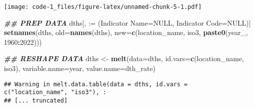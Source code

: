\documentclass[
]{article}
\newenvironment{Shaded}{\begin{snugshade}}{\end{snugshade}}
\newcommand{\AttributeTok}[1]{\textcolor[rgb]{0.13,0.29,0.53}{#1}}
\newcommand{\ConstantTok}[1]{\textcolor[rgb]{0.56,0.35,0.01}{#1}}
\newcommand{\DecValTok}[1]{\textcolor[rgb]{0.00,0.00,0.81}{#1}}
\newcommand{\DocumentationTok}[1]{\textcolor[rgb]{0.56,0.35,0.01}{\textbf{\textit{#1}}}}
\newcommand{\FunctionTok}[1]{\textcolor[rgb]{0.13,0.29,0.53}{\textbf{#1}}}
\newcommand{\NormalTok}[1]{#1}
\newcommand{\OtherTok}[1]{\textcolor[rgb]{0.56,0.35,0.01}{#1}}
\newcommand{\SpecialCharTok}[1]{\textcolor[rgb]{0.81,0.36,0.00}{\textbf{#1}}}
\newcommand{\StringTok}[1]{\textcolor[rgb]{0.31,0.60,0.02}{#1}}
\begin{document}
\texttt{[image: code-1\_files/figure-latex/unnamed-chunk-5-1.pdf]}

\begin{Shaded}
\begin{Highlighting}[]
\DocumentationTok{\#\# PREP DATA}
\NormalTok{dths[, }\StringTok{\textasciigrave{}}\AttributeTok{:=}\StringTok{\textasciigrave{}}\NormalTok{ (}\StringTok{\textasciigrave{}}\AttributeTok{Indicator Name}\StringTok{\textasciigrave{}}\OtherTok{=}\ConstantTok{NULL}\NormalTok{, }\StringTok{\textasciigrave{}}\AttributeTok{Indicator Code}\StringTok{\textasciigrave{}}\OtherTok{=}\ConstantTok{NULL}\NormalTok{)]}
\FunctionTok{setnames}\NormalTok{(dths, }\AttributeTok{old=}\FunctionTok{names}\NormalTok{(dths), }\AttributeTok{new=}\FunctionTok{c}\NormalTok{(}\StringTok{\textquotesingle{}location\_name\textquotesingle{}}\NormalTok{, }\StringTok{\textquotesingle{}iso3\textquotesingle{}}\NormalTok{, }\FunctionTok{paste0}\NormalTok{(}\StringTok{\textquotesingle{}year\_\textquotesingle{}}\NormalTok{, }\DecValTok{1960}\SpecialCharTok{:}\DecValTok{2022}\NormalTok{)))}

\DocumentationTok{\#\# RESHAPE DATA}
\NormalTok{dths }\OtherTok{\textless{}{-}} \FunctionTok{melt}\NormalTok{(}\AttributeTok{data=}\NormalTok{dths, }\AttributeTok{id.vars=}\FunctionTok{c}\NormalTok{(}\StringTok{\textquotesingle{}location\_name\textquotesingle{}}\NormalTok{, }\StringTok{\textquotesingle{}iso3\textquotesingle{}}\NormalTok{), }\AttributeTok{variable.name=}\StringTok{\textquotesingle{}year\textquotesingle{}}\NormalTok{, }\AttributeTok{value.name=}\StringTok{\textquotesingle{}dth\_rate\textquotesingle{}}\NormalTok{)}
\end{Highlighting}
\end{Shaded}

\begin{verbatim}
## Warning in melt.data.table(data = dths, id.vars = c("location_name", "iso3"), :
## [... truncated]
\end{verbatim}
\end{document}
